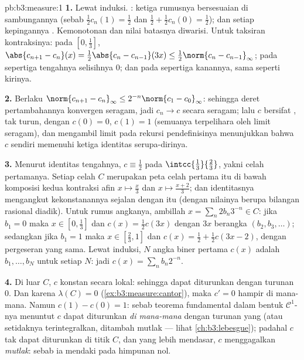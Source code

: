 \begin{solution}{pb:b3:measure:1}
\textbf{1.} Lewat induksi. : ketiga rumusnya bersesuaian di
sambungannya (sebab $\frac12c_n(1) = \frac12$ dan $\frac12 +
\frac12c_n(0) = \frac12$); dan setiap kepingannya .
Kemonotonan dan nilai batasnya diwarisi. Untuk
taksiran kontraksinya: pada $[0,\frac13]$, $\abs{c_{n+1} - c_n}(x)
= \frac12\abs{c_n - c_{n-1}}(3x) \leq \frac12\norm{c_n -
c_{n-1}}_\infty$; pada sepertiga tengahnya selisihnya $0$; dan pada
sepertiga kanannya, sama seperti kirinya.

\textbf{2.} Berlaku $\norm{c_{n+1} - c_n}_\infty \leq
2^{-n}\norm{c_1 - c_0}_\infty$: sehingga deret pertambahannya
konvergen seragam, jadi $c_n \to c$ secara seragam; lalu $c$ bersifat
, tak turun, dengan $c(0) = 0$, $c(1) = 1$ (semuanya
terpelihara oleh limit seragam), dan mengambil limit pada
rekursi pendefinisinya menunjukkan bahwa $c$ sendiri memenuhi ketiga
identitas serupa-dirinya.

\textbf{3.} Menurut identitas tengahnya, $c \equiv \frac12$ pada
$\intcc{\frac13}{\frac23}$, yakni celah pertamanya. Setiap celah $C$ merupakan
peta celah pertama itu di bawah komposisi kedua kontraksi
afin $x \mapsto \frac x3$ dan $x\mapsto\frac{x +
2}3$; dan identitasnya mengangkut kekonstanannya sejalan dengan itu (dengan
nilainya berupa bilangan rasional diadik). Untuk rumus angkanya, ambillah $x =
\sum_n 2b_n3^{-n} \in C$: jika $b_1 = 0$ maka $x \in
[0,\frac13]$ dan $c(x) = \frac12c(3x)$ dengan $3x$ berangka
$(b_2, b_3, \dots)$; sedangkan jika $b_1 = 1$ maka $x \in [\frac23, 1]$
dan $c(x) = \frac12 + \frac12c(3x - 2)$, dengan pergeseran yang sama. Lewat
induksi, $N$ angka biner pertama $c(x)$ adalah $b_1,
\dots, b_N$ untuk setiap $N$: jadi $c(x) = \sum_nb_n2^{-n}$.

\textbf{4.} Di luar $C$, $c$ konstan secara lokal: sehingga dapat diturunkan
dengan turunan $0$. Dan karena $\lambda(C) = 0$
(\cref{ex:b3:measure:cantor}), maka $c' = 0$ hampir di mana-mana. Namun
$c(1) - c(0) = 1$: sebab teorema fundamental dalam bentuk $\mathcal
C^1$-nya menuntut $c$ dapat diturunkan \emph{di mana-mana}
dengan turunan yang  (atau setidaknya terintegralkan, ditambah 
mutlak --- lihat \cref{ch:b3:lebesgue}); padahal $c$ tak
dapat diturunkan di titik $C$, dan yang lebih mendasar, $c$
menggagalkan \emph{ mutlak}: sebab ia mendaki pada himpunan nol.


\end{solution}
